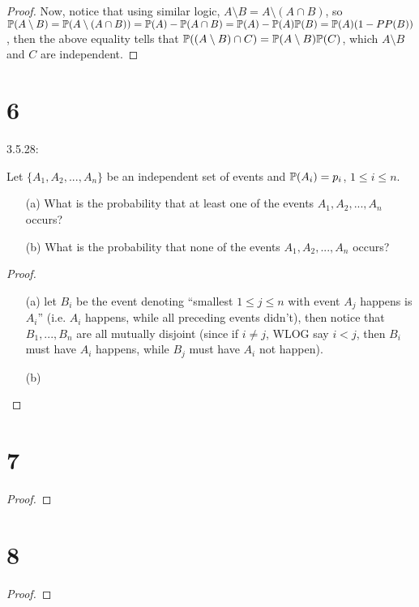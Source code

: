 \documentclass{article}
\begin{document}
\begin{proof}
    Now, notice that using similar logic, $A\setminus B=A\setminus (A\cap B)$, so $\mathbb{P}(A\setminus B)=\mathbb{P}(A\setminus (A\cap B))=\mathbb{P}(A)-\mathbb{P}(A\cap B)=\mathbb{P}(A)-\mathbb{P}(A)\mathbb{P}(B)=\mathbb{P}(A)(1-PP(B))$, then the above equality tells that $\mathbb{P}((A\setminus B)\cap C)=\mathbb{P}(A\setminus B)\mathbb{P}(C)$, which $A\setminus B$ and $C$ are independent.
\end{proof}

\newpage
\section*{6}
\begin{ques}\label{q6}
    3.5.28:

    Let $\{A_1,A_2,...,A_n\}$ be an independent set of events and $\mathbb{P}(A_i)=p_i$, $1\leq i\leq n$.
    \begin{itemize}
        \item[(a)] What is the probability that at least one of the events $A_1,A_2,...,A_n$ occurs?
        \item[(b)] What is the probability that none of the events $A_1,A_2,...,A_n$ occurs?
    \end{itemize}
\end{ques}

\begin{proof}

    \hfil

    \begin{itemize}
        \item[(a)] let $B_i$ be the event denoting ``smallest $1\leq j\leq n$ with event $A_j$ happens is $A_i$'' (i.e. $A_i$ happens, while all preceding events didn't), then notice that $B_1,...,B_n$ are all mutually disjoint (since if $i\neq j$, WLOG say $i<j$, then $B_i$ must have $A_i$ happens, while $B_j$ must have $A_i$ not happen).
        \item[(b)] 
    \end{itemize}
\end{proof}

\newpage
\section*{7}
\begin{ques}\label{q7}
\end{ques}

\begin{proof}
\end{proof}

\newpage
\section*{8}
\begin{ques}\label{q8}
\end{ques}

\begin{proof}
\end{proof}
\end{document}
